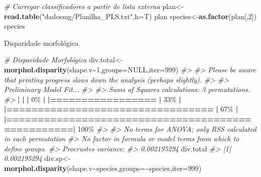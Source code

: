 \documentclass[
]{book}
\newenvironment{Shaded}{\begin{snugshade}}{\end{snugshade}}
\newcommand{\AttributeTok}[1]{\textcolor[rgb]{0.13,0.29,0.53}{#1}}
\newcommand{\CommentTok}[1]{\textcolor[rgb]{0.56,0.35,0.01}{\textit{#1}}}
\newcommand{\ConstantTok}[1]{\textcolor[rgb]{0.56,0.35,0.01}{#1}}
\newcommand{\DecValTok}[1]{\textcolor[rgb]{0.00,0.00,0.81}{#1}}
\newcommand{\ErrorTok}[1]{\textcolor[rgb]{0.64,0.00,0.00}{\textbf{#1}}}
\newcommand{\FunctionTok}[1]{\textcolor[rgb]{0.13,0.29,0.53}{\textbf{#1}}}
\newcommand{\NormalTok}[1]{#1}
\newcommand{\OtherTok}[1]{\textcolor[rgb]{0.56,0.35,0.01}{#1}}
\newcommand{\SpecialCharTok}[1]{\textcolor[rgb]{0.81,0.36,0.00}{\textbf{#1}}}
\newcommand{\StringTok}[1]{\textcolor[rgb]{0.31,0.60,0.02}{#1}}
\begin{document}
\begin{Shaded}
\begin{Highlighting}[]
\CommentTok{\# Carregar classificadores a partir de lista externa}
\NormalTok{plan}\OtherTok{\textless{}{-}}\FunctionTok{read.table}\NormalTok{(}\StringTok{"dadosmg/Planilha\_PLS.txt"}\NormalTok{,}\AttributeTok{h=}\NormalTok{T)}
\NormalTok{plan}
\NormalTok{species}\OtherTok{\textless{}{-}}\FunctionTok{as.factor}\NormalTok{(plan[,}\DecValTok{2}\NormalTok{])}
\NormalTok{species}
\end{Highlighting}
\end{Shaded}

Disparidade morfológica.

\begin{Shaded}
\begin{Highlighting}[]
\CommentTok{\# Disparidade Morfológica}
\NormalTok{div.total}\OtherTok{\textless{}{-}}\FunctionTok{morphol.disparity}\NormalTok{(shape.v}\SpecialCharTok{\textasciitilde{}}\DecValTok{1}\NormalTok{,}\AttributeTok{groups=}\ConstantTok{NULL}\NormalTok{,}\AttributeTok{iter=}\DecValTok{999}\NormalTok{)}
\CommentTok{\#\textgreater{} }
\CommentTok{\#\textgreater{} Please be aware that printing progress slows down the analysis (perhaps slightly).}
\CommentTok{\#\textgreater{} }
\CommentTok{\#\textgreater{} Preliminary Model Fit...}
\CommentTok{\#\textgreater{} }
\CommentTok{\#\textgreater{} Sums of Squares calculations: 3 permutations.}
\CommentTok{\#\textgreater{} }
  \SpecialCharTok{|}                                                        
  \ErrorTok{|}                                                  \ErrorTok{|}   \DecValTok{0}\NormalTok{\%}
  \SpecialCharTok{|}                                                        
  \ErrorTok{|=================}                                 \ErrorTok{|}  \DecValTok{33}\NormalTok{\%}
  \SpecialCharTok{|}                                                        
  \ErrorTok{|=================================}                 \ErrorTok{|}  \DecValTok{67}\NormalTok{\%}
  \SpecialCharTok{|}                                                        
  \ErrorTok{|==================================================|} \DecValTok{100}\NormalTok{\%}
\CommentTok{\#\textgreater{} }
\CommentTok{\#\textgreater{} No terms for ANOVA; only RSS calculated in each permutation}
\CommentTok{\#\textgreater{} No factor in formula or model terms from which to define groups.}
\CommentTok{\#\textgreater{} Procrustes variance:}
\CommentTok{\#\textgreater{} 0.002195294}
\NormalTok{div.total}
\CommentTok{\#\textgreater{} [1] 0.002195294}
\NormalTok{div.sp}\OtherTok{\textless{}{-}}\FunctionTok{morphol.disparity}\NormalTok{(shape.v}\SpecialCharTok{\textasciitilde{}}\NormalTok{species,}\AttributeTok{groups=}\SpecialCharTok{\textasciitilde{}}\NormalTok{species,}\AttributeTok{iter=}\DecValTok{999}\NormalTok{)}

\end{Highlighting}
\end{Shaded}
\end{document}
